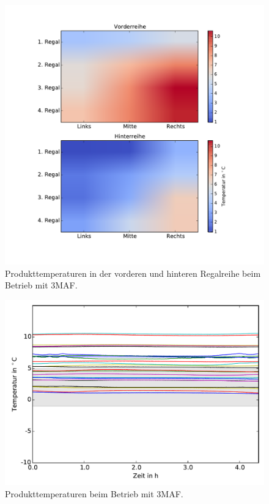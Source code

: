 \begin{figure}[h!]
\centering
\includegraphics[scale=0.8]{Pictures/35/load_colormap_lastCycle10perc.pdf}
\caption{Produkttemperaturen in der vorderen und hinteren Regalreihe beim Betrieb mit 3MAF.}
\label{fig:prodtempmap35}
\end{figure}

\begin{figure}[h!]
\centering
\includegraphics[scale=0.8]{Pictures/35/ProductTemperature.pdf}
\caption{Produkttemperaturen beim Betrieb mit 3MAF.}
\label{fig:prodtemp35}
\end{figure}




